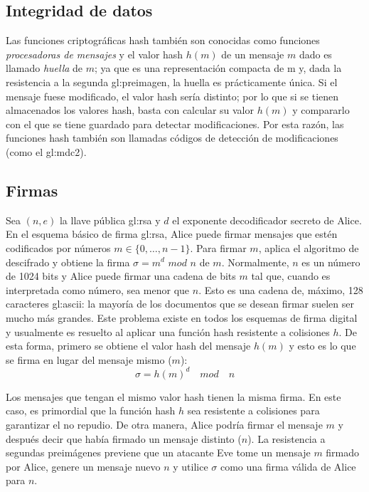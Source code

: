 \subsection{Integridad de datos}

Las funciones criptográficas hash también son conocidas como funciones
\textit{procesadoras de mensajes} y el valor hash $h(m)$ de un mensaje
$m$ dado es llamado \textit{huella} de $m$; ya que es una representación
compacta de m y, dada la resistencia a la segunda \gls{gl:preimagen}, la huella
es prácticamente única. Si el mensaje fuese modificado, el valor hash
sería distinto; por lo que si se tienen almacenados los valores hash,
basta con calcular su valor $h(m)$ y compararlo con el que se tiene
guardado para detectar modificaciones. Por esta razón, las funciones
hash también son llamadas códigos de detección de modificaciones (como el
\gls{gl:mdc2}).

\subsection{Firmas}

Sea $(n, e)$ la llave pública \gls{gl:rsa} y $d$ el exponente decodificador
secreto de Alice. En el esquema básico de firma \gls{gl:rsa}, Alice puede
firmar mensajes que estén codificados por números $ m \in \{0, \dots, n-1\}$.
Para firmar $m$, aplica el algoritmo de descifrado y obtiene la firma
$\sigma = m^d$ $mod$ $n$ de $m$.
Normalmente, $n$ es un número de 1024 bits y Alice puede firmar una
cadena de bits $m$ tal que, cuando es interpretada como número, sea
menor que $n$. Esto es una cadena de, máximo, 128 caracteres
\gls{gl:ascii}: la mayoría de los documentos que se desean firmar suelen
ser mucho más grandes. Este problema existe en todos los esquemas de firma
digital y usualmente es resuelto al aplicar una función hash resistente a
colisiones $h$. De esta forma, primero se obtiene el valor hash del mensaje
$h(m)$ y esto es lo que se firma en lugar del mensaje mismo ($m$):
\begin{equation}
  \label{funcion_hash_sign}
  \sigma = h(m)^d \quad mod \quad n
\end{equation}

Los mensajes que tengan el mismo valor hash tienen la misma firma. En
este caso, es primordial que la función hash $h$ sea resistente a
colisiones para garantizar el no repudio. De otra manera, Alice podría
firmar el mensaje $m$ y después decir que había firmado un mensaje
distinto ($n$).
La resistencia a segundas preimágenes previene que un atacante Eve tome
un mensaje $m$ firmado por Alice, genere un mensaje nuevo $n$ y utilice
$\sigma$ como una firma válida de Alice para $n$.

